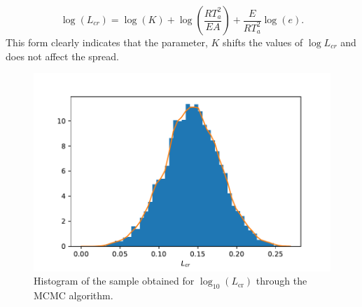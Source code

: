 \begin{equation}
\log \left(L_{cr}\right)=\log (K)+\log\left(\frac{RT_a^2}{EA}\right) +\frac{E}{RT_a^2}\log( e).
\end{equation}
This form clearly indicates that the parameter, $K$ shifts the values of $\log L_{cr}$ and does not affect the spread.\\
\begin{figure}
\centering
\includegraphics[scale=1]{figures/bayesian/hist_Lcr.pdf}
\caption{Histogram of the sample obtained for $\log_{10}\left(L_{\text{cr}}\right)$ through the MCMC algorithm.}
\label{fig:HistL}
\end{figure}

